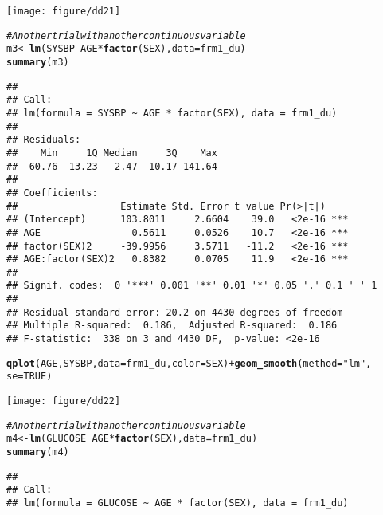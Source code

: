 \documentclass{article}\usepackage[]{graphicx}\usepackage[]{color}
\makeatletter
\def\maxwidth{ %
  \ifdim\Gin@nat@width>\linewidth
    \linewidth
  \else
    \Gin@nat@width
  \fi
}
\newcommand{\hlnum}[1]{\textcolor[rgb]{0.686,0.059,0.569}{#1}}%
\newcommand{\hlstr}[1]{\textcolor[rgb]{0.192,0.494,0.8}{#1}}%
\newcommand{\hlcom}[1]{\textcolor[rgb]{0.678,0.584,0.686}{\textit{#1}}}%
\newcommand{\hlopt}[1]{\textcolor[rgb]{0,0,0}{#1}}%
\newcommand{\hlstd}[1]{\textcolor[rgb]{0.345,0.345,0.345}{#1}}%
\newcommand{\hlkwb}[1]{\textcolor[rgb]{0.69,0.353,0.396}{#1}}%
\newcommand{\hlkwc}[1]{\textcolor[rgb]{0.333,0.667,0.333}{#1}}%
\newcommand{\hlkwd}[1]{\textcolor[rgb]{0.737,0.353,0.396}{\textbf{#1}}}%
\newenvironment{kframe}{%
 \def\at@end@of@kframe{}%
 \ifinner\ifhmode%
  \def\at@end@of@kframe{\end{minipage}}%
  \begin{minipage}{\columnwidth}%
 \fi\fi%
 \def\FrameCommand##1{\hskip\@totalleftmargin \hskip-\fboxsep
 \colorbox{shadecolor}{##1}\hskip-\fboxsep
     \hskip-\linewidth \hskip-\@totalleftmargin \hskip\columnwidth}%
 \MakeFramed {\advance\hsize-\width
   \@totalleftmargin\z@ \linewidth\hsize
   \@setminipage}}%
 {\par\unskip\endMakeFramed%
 \at@end@of@kframe}
\newenvironment{knitrout}{}{} %
\makeatother
\begin{document}
\begin{knitrout}
\begin{kframe}
{\ttfamily\noindent\color{warningcolor}{\#\# Warning: Removed 5 rows containing missing values (stat\_smooth).\\\#\# Warning: Removed 14 rows containing missing values (stat\_smooth).\\\#\# Warning: Removed 19 rows containing missing values (geom\_point).}}\end{kframe}
\texttt{[image: figure/dd21]} 
\begin{kframe}\begin{alltt}
\hlcom{# Another trial with another continuous variable}
\hlstd{m3} \hlkwb{<-} \hlkwd{lm}\hlstd{(SYSBP} \hlopt{~} \hlstd{AGE} \hlopt{*} \hlkwd{factor}\hlstd{(SEX),} \hlkwc{data} \hlstd{= frm1_du)}
\hlkwd{summary}\hlstd{(m3)}
\end{alltt}
\begin{verbatim}
## 
## Call:
## lm(formula = SYSBP ~ AGE * factor(SEX), data = frm1_du)
## 
## Residuals:
##    Min     1Q Median     3Q    Max 
## -60.76 -13.23  -2.47  10.17 141.64 
## 
## Coefficients:
##                  Estimate Std. Error t value Pr(>|t|)    
## (Intercept)      103.8011     2.6604    39.0   <2e-16 ***
## AGE                0.5611     0.0526    10.7   <2e-16 ***
## factor(SEX)2     -39.9956     3.5711   -11.2   <2e-16 ***
## AGE:factor(SEX)2   0.8382     0.0705    11.9   <2e-16 ***
## ---
## Signif. codes:  0 '***' 0.001 '**' 0.01 '*' 0.05 '.' 0.1 ' ' 1
## 
## Residual standard error: 20.2 on 4430 degrees of freedom
## Multiple R-squared:  0.186,	Adjusted R-squared:  0.186 
## F-statistic:  338 on 3 and 4430 DF,  p-value: <2e-16
\end{verbatim}
\begin{alltt}
\hlkwd{qplot}\hlstd{(AGE, SYSBP,} \hlkwc{data} \hlstd{= frm1_du,} \hlkwc{color} \hlstd{= SEX)} \hlopt{+} \hlkwd{geom_smooth}\hlstd{(}\hlkwc{method} \hlstd{=} \hlstr{"lm"}\hlstd{,}
    \hlkwc{se} \hlstd{=} \hlnum{TRUE}\hlstd{)}
\end{alltt}
\end{kframe}
\texttt{[image: figure/dd22]} 
\begin{kframe}\begin{alltt}
\hlcom{# Another trial with another continuous variable}
\hlstd{m4} \hlkwb{<-} \hlkwd{lm}\hlstd{(GLUCOSE} \hlopt{~} \hlstd{AGE} \hlopt{*} \hlkwd{factor}\hlstd{(SEX),} \hlkwc{data} \hlstd{= frm1_du)}
\hlkwd{summary}\hlstd{(m4)}
\end{alltt}
\begin{verbatim}
## 
## Call:
## lm(formula = GLUCOSE ~ AGE * factor(SEX), data = frm1_du)

\end{verbatim}
\end{kframe}
\end{knitrout}
\end{document}
